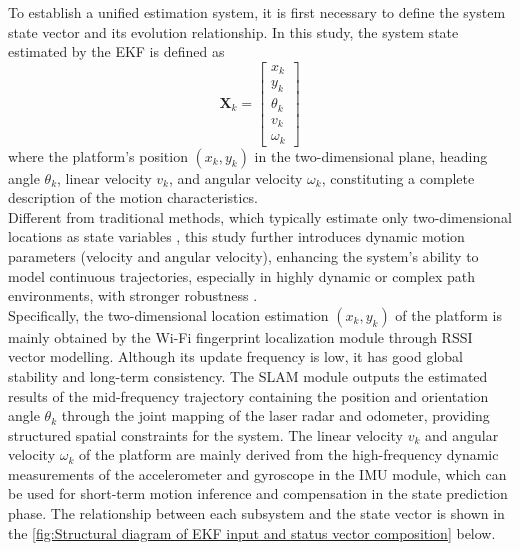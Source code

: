 \documentclass[12pt,a4paper]{article}
\numberwithin{equation}{section}
\begin{document}
\noindent To establish a unified estimation system, it is first necessary to define the system state vector and its evolution relationship. In this study, the system state estimated by the EKF is defined as
\begin{equation}
\mathbf{X}_k =
\begin{bmatrix}
x_k \\
y_k \\
\theta_k \\
v_k \\
\omega_k
\end{bmatrix}
\label{eq:Xk_definition}
\end{equation}
where the platform's position $(x_k, y_k)$ in the two-dimensional plane, heading angle $\theta_k$, linear velocity $v_k$, and angular velocity $\omega_k$, constituting a complete description of the motion characteristics.\\
Different from traditional methods, which typically estimate only two-dimensional locations as state variables \cite{li2006indoor}, this study further introduces dynamic motion parameters (velocity and angular velocity), enhancing the system's ability to model continuous trajectories, especially in highly dynamic or complex path environments, with stronger robustness \cite{sun2019fusion}.\\
Specifically, the two-dimensional location estimation $(x_k, y_k)$ of the platform is mainly obtained by the Wi-Fi fingerprint localization module through RSSI vector modelling. Although its update frequency is low, it has good global stability and long-term consistency. The SLAM module outputs the estimated results of the mid-frequency trajectory containing the position and orientation angle $\theta_k$ through the joint mapping of the laser radar and odometer, providing structured spatial constraints for the system. The linear velocity $v_k$ and angular velocity $\omega_k$ of the platform are mainly derived from the high-frequency dynamic measurements of the accelerometer and gyroscope in the IMU module, which can be used for short-term motion inference and compensation in the state prediction phase. The relationship between each subsystem and the state vector is shown in the \autoref{fig:Structural diagram of EKF input and status vector composition} below.
\end{document}
